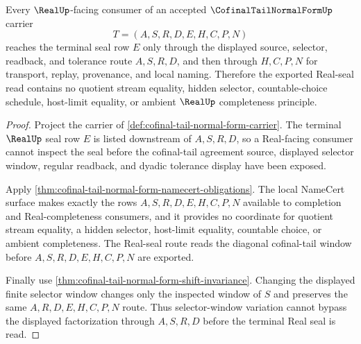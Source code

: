 \begin{theorem}
\label{thm:cofinal-tail-normal-form-real-seal-factorization}
Every $\RealUp$-facing consumer of an accepted $\CofinalTailNormalFormUp$ carrier
$$
T=(A,S,R,D,E,H,C,P,N)
$$
reaches the terminal seal row $E$ only through the displayed source, selector, readback, and tolerance route $A,S,R,D$, and then through $H,C,P,N$ for transport, replay, provenance, and local naming. Therefore the exported Real-seal read contains no quotient stream equality, hidden selector, countable-choice schedule, host-limit equality, or ambient $\RealUp$ completeness principle.
\end{theorem}
\begin{proof}
Project the carrier of \autoref{def:cofinal-tail-normal-form-carrier}. The terminal $\RealUp$ seal row $E$ is listed downstream of $A,S,R,D$, so a Real-facing consumer cannot inspect the seal before the cofinal-tail agreement source, displayed selector window, regular readback, and dyadic tolerance display have been exposed.

Apply \autoref{thm:cofinal-tail-normal-form-namecert-obligations}. The local NameCert surface makes exactly the rows $A,S,R,D,E,H,C,P,N$ available to completion and Real-completeness consumers, and it provides no coordinate for quotient stream equality, a hidden selector, host-limit equality, countable choice, or ambient completeness. The Real-seal route reads the diagonal cofinal-tail window before $A,S,R,D,E,H,C,P,N$ are exported.

Finally use \autoref{thm:cofinal-tail-normal-form-shift-invariance}. Changing the displayed finite selector window changes only the inspected window of $S$ and preserves the same $A,R,D,E,H,C,P,N$ route. Thus selector-window variation cannot bypass the displayed factorization through $A,S,R,D$ before the terminal Real seal is read.
\end{proof}



